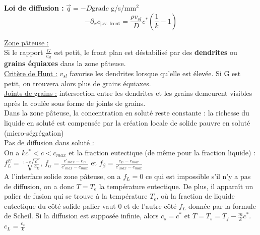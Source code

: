\documentclass[../main.tex]{subfiles}
\begin{document}
\textbf{Loi de diffusion :} $\Vec{q} = -D \text{grad} c$ g/s/mm$^2$\\

\begin{equation}
    -\partial_x c_{\lvert \text{av. front}} = \frac{\rho v_{sl}}{D} c^*(\frac{1}{k}-1)
\end{equation}

\quad \underline{Zone pâteuse :}\\
Si le rapport $\frac{G}{v_{sl}}$ est petit, le front plan est déstabilisé par des \textbf{dendrites} ou \textbf{grains équiaxes} dans la zone pâteuse.\\

\underline{Critère de Hunt :} $v_{sl}$ favorise les dendrites lorsque qu'elle est élevée. Si G est petit, on trouvera alors plus de grains équiaxes.\\

\underline{Joints de grains :} intersection entre les dendrites et les grains demeurent visibles après la coulée sous forme de joints de grains.\\

Dans la zone pâteuse, la concentration en soluté reste constante : la richesse du liquide en soluté est compensée par la création locale de solide pauvre en soluté (micro-ségrégation)\\

\quad \underline{Pas de diffusion dans soluté :}\\

On a $kc^*<c<c_{max}$ et la fraction eutectique (de même pour la fraction liquide) : $f_L^E = \sqrt[1-k]{\frac{c^*}{c_E}}$, $f_\alpha = \frac{c'_{max}-c_E}{c'_{max}-c_{max}}$ et $f_\beta = \frac{c_E-c_{max}}{c'_{max}-c_{max}}$\\
\warning A l'interface solide zone pâteuse, on a $f_L = 0$ ce qui est impossible s'il n'y a pas de diffusion, on a donc $T = T_e$ la température eutectique. De plus, il apparaît un palier de fusion qui se trouve à la température $T_e$, où la fraction de liquide eutectique du côté solide-palier vaut 0 et de l'autre côté $f_L$ donnée par la formule de Scheil. Si la diffusion est supposée infinie, alors $c_s = c^*$ et $T = T_s = T_f- \frac{m}{k}c^*$. \\
\warning $c_L = \frac{c_s}{k}$
\end{document}
